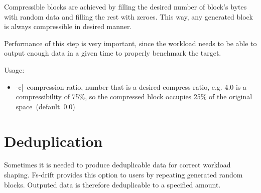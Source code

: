 \documentclass[
  color, %
  table, %
  lof,   %
  lot,   %
]{fithesis3}
\begin{document}
Compressible blocks are achieved by filling the desired number of block's bytes with random data and filling the rest with zeroes. This way, any generated block is always compressible in desired manner.

Performance of this step is very important, since the workload needs to be able to output enough data in a given time to properly benchmark the target.



Usage:
\begin{itemize}
    \item -c|--compression-ratio, number that is a desired compress ratio, e.g. 4.0 is a compressibility of 75\%, so the compressed block occupies 25\% of the original space~(default~0.0)
\end{itemize}


\section{Deduplication}
Sometimes it is needed to produce deduplicable data for correct workload shaping. Fs-drift provides this option to users by repeating generated random blocks. Outputed data is therefore deduplicable to a specified amount.


\end{document}
